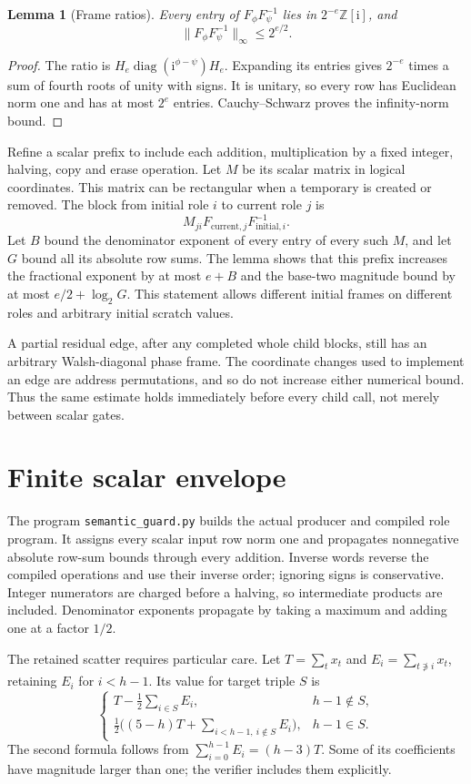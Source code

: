 \documentclass[11pt]{article}
\newtheorem{lemma}{Lemma}
\newcommand{\ii}{\mathrm i}
\newcommand{\Z}{\mathbb Z}
\begin{document}
\begin{lemma}[Frame ratios]
Every entry of $F_\phi F_\psi^{-1}$ lies in $2^{-e}\Z[\ii]$, and
\[
               \|F_\phi F_\psi^{-1}\|_\infty\le 2^{e/2}.
\]
\end{lemma}
\begin{proof}
The ratio is $H_e\operatorname{diag}(\ii^{\phi-\psi})H_e$.
Expanding its entries gives $2^{-e}$ times a sum of fourth roots of unity
with signs. It is unitary, so every row has Euclidean norm one and has
at most $2^e$ entries. Cauchy--Schwarz proves the infinity-norm bound.
\end{proof}

Refine a scalar prefix to include each addition, multiplication by a fixed
integer, halving, copy and erase operation. Let $M$ be its scalar matrix
in logical coordinates. This matrix can be rectangular when a temporary is
created or removed. The block from initial role $i$ to current role $j$ is
\[
                 M_{ji}F_{\mathrm{current},j}F_{\mathrm{initial},i}^{-1}.
\]
Let $B$ bound the denominator exponent of every entry of every such $M$,
and let $G$ bound all its absolute row sums. The lemma shows that this
prefix increases the fractional exponent by at most $e+B$ and the
base-two magnitude bound by at most $e/2+\log_2G$.
This statement allows different initial frames on different roles and
arbitrary initial scratch values.

A partial residual edge, after any completed whole child blocks, still has
an arbitrary Walsh-diagonal phase frame. The coordinate changes used to
implement an edge are address permutations, and so do not increase either
numerical bound. Thus the same estimate holds immediately before every
child call, not merely between scalar gates.

\section{Finite scalar envelope}
The program \texttt{semantic\_guard.py} builds the actual producer and
compiled role program. It assigns every scalar input row norm one and
propagates nonnegative absolute row-sum bounds through every addition.
Inverse words reverse the compiled operations and use their inverse order;
ignoring signs is conservative. Integer numerators are charged before a
halving, so intermediate products are included. Denominator exponents
propagate by taking a maximum and adding one at a factor $1/2$.

The retained scatter requires particular care. Let
$T=\sum_t x_t$ and $E_i=\sum_{t\not\ni i}x_t$, retaining $E_i$ for
$i<h-1$. Its value for target triple $S$ is
\[
 \begin{cases}
 T-\frac12\sum_{i\in S}E_i,&h-1\notin S,\\[2pt]
 \frac12\bigl((5-h)T+\sum_{i<h-1,\ i\notin S}E_i\bigr),&h-1\in S.
 \end{cases}
\]
The second formula follows from $\sum_{i=0}^{h-1}E_i=(h-3)T$.
Some of its coefficients have magnitude larger than one; the verifier
includes them explicitly.
\end{document}
